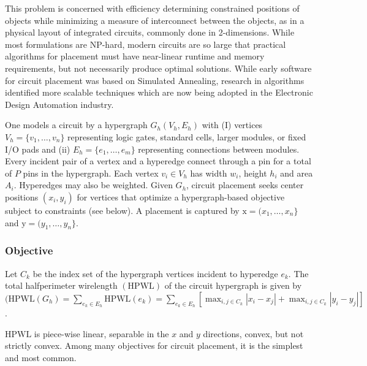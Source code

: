 \documentclass[natbib]{svcyclop}
\begin{document}
\ProbDef

This problem is concerned with efficiency determining constrained
positions of objects while minimizing a measure of interconnect between
the objects, as in a physical layout of integrated circuits, commonly
done in 2-dimensions. While most formulations are NP-hard, modern circuits
are so large that practical algorithms for placement
must have near-linear runtime and memory requirements,
but not necessarily produce optimal solutions. While early
software for circuit placement was based on Simulated Annealing,
research in algorithms identified more scalable
techniques which are now being adopted in the Electronic
Design Automation industry.

One models a circuit by a hypergraph $G_h(V_h,E_h)$ with (I) vertices
$V_h=\{v_1,\ldots,v_n\}$ representing logic gates,
standard cells, larger modules, or fixed I/O pads and (ii)
$E_h=\{e_1,\ldots,e_m\}$ representing connections
between modules. Every incident pair of a vertex and a hyperedge
connect through a pin for a total of $P$ pins in the
hypergraph. Each vertex $v_i\in V_h$ has width $w_i$, height
$h_i$ and area $A_i$. Hyperedges may also be weighted. Given
$G_h$, circuit placement seeks center positions $(x_i,y_i)$ for vertices
that optimize a hypergraph-based objective subject
to constraints (see below). A placement is captured by
$\mathrm{x}= (x_1,\ldots,x_n\}$ and $\mathrm{y}= (y_1,\ldots,y_n\}$.

\subsubsection{Objective} Let $C_k$ be the index set of the hypergraph
vertices incident to hyperedge $e_k$. The total halfperimeter
wirelength $(\mathrm{HPWL})$ of the circuit hypergraph
is given by $(\mathrm{HPWL}(G_h) = \sum_{e_k\in E_h}\mathrm{HPWL}(e_k) =
\sum_{e_k\in E_h}\left[\max_{i,j\in C_k}|x_i - x_j|+\max_{i,j\in C_k}
|y_i - y_j|\right]$.

$\mathrm{HPWL}$ is piece-wise linear, separable in the $x$ and $y$ directions,
convex, but not strictly convex. Among many
objectives for circuit placement, it is the simplest and
most common.
\end{document}
